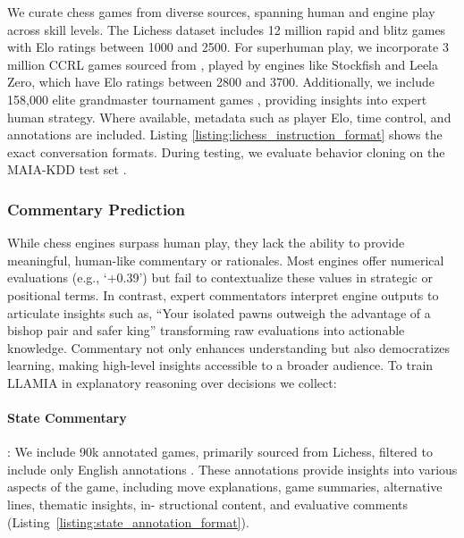\documentclass{article}
\theoremstyle{plain}
\theoremstyle{definition}
\theoremstyle{remark}
\begin{document}
We curate chess games from diverse sources, spanning human and engine play across skill levels. The Lichess dataset includes 12 million rapid and blitz games with Elo ratings between 1000 and 2500. For superhuman play, we incorporate 3 million CCRL games sourced from \cite{feng2024chessgpt},  played by engines like Stockfish and Leela Zero, which have Elo ratings between 2800 and 3700. Additionally, we include 158,000 elite grandmaster tournament games \cite{gmchessgames2022}, providing insights into expert human strategy. Where available, metadata such as player Elo, time control, and annotations are included. Listing \ref{listing:lichess_instruction_format} shows the exact conversation formats. 
During testing, we evaluate behavior cloning on the MAIA-KDD test set \cite{mcilroy2020aligning}.

\subsubsection{Commentary Prediction}
\label{sec:commentary}
While chess engines surpass human play, they lack the ability to provide meaningful, human-like commentary or rationales. Most engines offer numerical evaluations (e.g., `+0.39') but fail to contextualize these values in strategic or positional terms. In contrast, expert commentators interpret engine outputs to articulate insights such as, ``Your isolated pawns outweigh the advantage of a bishop pair and safer king'' transforming raw evaluations into actionable knowledge. Commentary not only enhances understanding but also democratizes learning, making high-level insights accessible to a broader audience. To train LLAMIA in explanatory reasoning over decisions we collect:

\paragraph{State Commentary}: We include 90k annotated games, primarily sourced from Lichess, filtered to include only English annotations \cite{jhamtani-etal-2018-learning}. These annotations provide insights into
various aspects of the game, including move explanations,
game summaries, alternative lines, thematic insights, in-
structional content, and evaluative comments (Listing~\ref{listing:state_annotation_format}).
\end{document}
